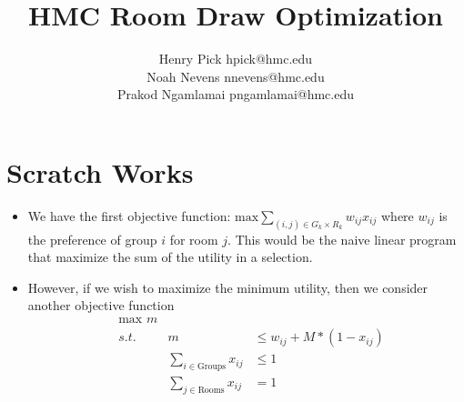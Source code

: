 \documentclass[12pt]{article}
\author{Henry Pick \small hpick@hmc.edu \\
\large Noah Nevens \small nnevens@hmc.edu \\
\large Prakod Ngamlamai \small pngamlamai@hmc.edu}
\title{HMC Room Draw Optimization}
\begin{document}
    \maketitle
    \section*{Scratch Works}
    \begin{itemize}
        \item We have the first objective function: $\text{max} \sum_{(i,j) \in G_k \times R_k}  w_{ij}x_{ij}$ where $w_{ij}$ is the preference of group $i$ for room $j$. This would be the naive linear program that maximize the sum of the utility in a selection. 
        \item However, if we wish to maximize the minimum utility, then we consider another objective function \begin{align*}
            &\text{max  } m \\
            &s.t. &m &\leq w_{ij} + M*(1-x_{ij}) \\
            & &\sum_{i \in \text{Groups}}x_{ij} &\leq 1 \\
            & &\sum_{j \in \text{Rooms}}x_{ij} &= 1 \\
        \end{align*}
    \end{itemize}
\end{document}
